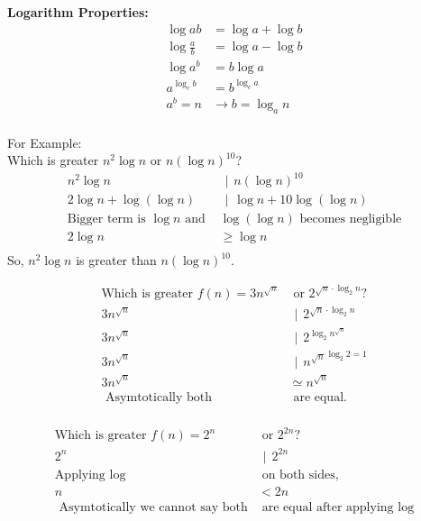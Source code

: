 \documentclass[]{article}
\newcommand{\bioperation}{{\hspace{5pt} | \hspace{5pt}}}
\begin{document}
\textbf{Logarithm Properties: } \\
\[ 
\begin{aligned}
    \log{ab} &= \log{a} + \log{b} \\
    \log{\frac{a}{b}} &= \log{a} - \log{b} \\
    \log{a^b} &= b\log{a} \\
    a^{\log_c{b}} &= b^{\log_c{a}} \\
    a^b = n &\rightarrow b = \log_a{n} \\
\end{aligned}
\]

For Example: \\
Which is greater $n^2\log{n} \text{ or } n{(\log{n})}^{10}$? \\
\[
\begin{aligned}
    n^2\log{n} &\bioperation n{(\log{n})}^{10} \\
    2\log{n} + \log(\log{n}) &\bioperation \log{n} + 10{\log(\log{n})} \\
    \text{Bigger term is $\log{n}$ and } &\log({\log{n}}) \text{ becomes negligible}\\
    2\log{n} &\geq \log{n} \\
\end{aligned}
\]
So, $n^2\log{n}$ is greater than $n{(\log{n})}^{10}$.

\[
\begin{aligned}
    \text{Which is greater } f(n) = 3n^{\sqrt{n}} &\text{ or } 2^{\sqrt{n}\cdot \log_2{n}}? \\
    3n^{\sqrt{n}} &\bioperation 2^{\sqrt{n}\cdot \log_2{n}} \\
    3n^{\sqrt{n}} &\bioperation 2^{\log_2{n^{\sqrt{n}}}} \\
    3n^{\sqrt{n}} &\bioperation {n^{\sqrt{n}}}^{\log_2{2} = 1} \\
    3n^{\sqrt{n}} &\simeq  n^{\sqrt{n}} \\
    \text{ Asymtotically both} &\text{ are equal.} \\
\end{aligned}
\]

\[
\begin{aligned}
    \text{Which is greater } f(n) = 2^n &\text{ or } 2^{2n}? \\
    2^n &\bioperation 2^{2n} \\
    \text{Applying }\log &\text{ on both sides, }\\
    n &< 2n \\
    \text{ Asymtotically we cannot say both} &\text{ are equal after applying } \log \\
\end{aligned}
\]
\end{document}

